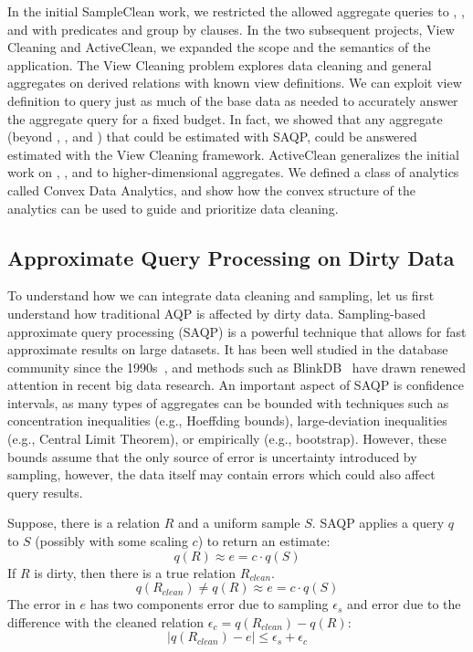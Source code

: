 In the initial SampleClean work, we restricted the allowed aggregate queries to \sumfunc, \countfunc, and \avgfunc with predicates and group by clauses.
In the two subsequent projects, View Cleaning and ActiveClean, we expanded the scope and the semantics of the application. 
The View Cleaning problem explores data cleaning and general aggregates on derived relations with known view definitions.
We can exploit view definition to query just as much of the base data as needed to accurately answer the aggregate query for a fixed budget.
In fact, we showed that any aggregate (beyond \sumfunc, \countfunc, and \avgfunc) that could be estimated with SAQP\cite{agarwalknowing}, could be answered estimated with the View Cleaning framework.
ActiveClean generalizes the initial work on \sumfunc, \countfunc, and \avgfunc to higher-dimensional aggregates.
We defined a class of analytics called Convex Data Analytics, and show how the convex structure of the analytics can be used to guide and prioritize data cleaning.

\subsection{Approximate Query Processing on Dirty Data}
To understand how we can integrate data cleaning and sampling, let us first understand how traditional AQP is affected by dirty data.
Sampling-based approximate query processing (SAQP) is a powerful technique that allows for fast approximate results on large datasets. 
It has been well studied in the database community since the 1990s~\cite{DBLP:conf/sigmod/HellersteinHW97,DBLP:conf/sigmod/AcharyaGPR99}, and methods such as BlinkDB~\cite{DBLP:conf/eurosys/AgarwalMPMMS13} have drawn renewed attention in recent big data research. 
An important aspect of SAQP is confidence intervals, as many types of aggregates can be bounded with techniques such as concentration inequalities (e.g., Hoeffding bounds), large-deviation inequalities (e.g., Central Limit Theorem), or empirically (e.g., bootstrap).
However, these bounds assume that the only source of error is uncertainty introduced by sampling, however, the data itself may contain errors which could also affect query results. 

Suppose, there is a relation $R$ and a uniform sample $S$.
SAQP applies a query $q$ to $S$ (possibly with some scaling $c$) to return an estimate:
\[
q(R) \approx e = c \cdot q(S)
\]
If $R$ is dirty, then there is a true relation $R_{clean}$.
\[
q(R_{clean}) \ne q(R) \approx e = c \cdot q(S)
\]
The error in $e$ has two components error due to sampling $\epsilon_s$ and error due to the difference with the cleaned relation $\epsilon_c = q(R_{clean}) - q(R)$:
\[
\mid q(R_{clean}) - e \mid \le \epsilon_s + \epsilon_c
\]

